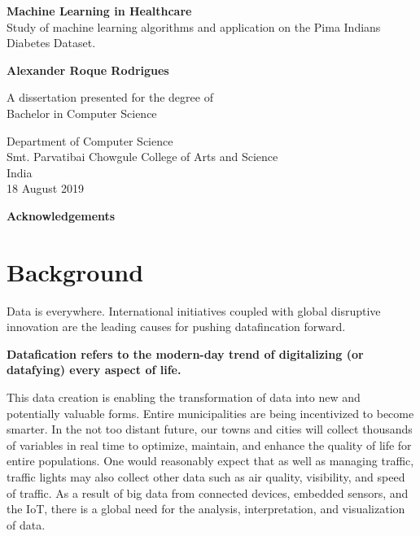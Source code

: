 \documentclass[12pt]{article}
\begin{document}
\begin{titlepage}
    \begin{center}
        \vspace*{1cm} 
        \Huge
        \textbf{Machine Learning in Healthcare} 
        \vspace{0.5cm}
        \normalsize
        \vspace{0cm}
        \\
        Study of machine learning algorithms and application on the Pima Indians Diabetes Dataset.
 
        \vspace{1.5cm}
 
        \textbf{Alexander Roque Rodrigues}
 
        \vfill
 
        A dissertation presented for the degree of\\
        Bachelor in Computer Science
 
        \vspace{0.8cm}
  
        \Large
        Department of Computer Science\\        
        Smt. Parvatibai Chowgule College of Arts and Science\\
        India\\
        18 August 2019
 
    \end{center}
\end{titlepage}
\Huge
\newpage
\huge
\textbf{Acknowledgements}
\normalsize
\newpage
\tableofcontents
\newpage
\part{Background}
Data is everywhere. International initiatives coupled with global disruptive innovation are the leading causes for pushing datafincation forward.

\textbf{Datafication refers to the modern-day trend of digitalizing (or datafying) every aspect of life.}

This data creation is enabling the transformation of data into new and potentially valuable forms. Entire municipalities are being incentivized to become smarter. In the not too
distant future, our towns and cities will collect thousands of variables in
real time to optimize, maintain, and enhance the quality of life for entire
populations. One would reasonably expect that as well as managing traffic,
traffic lights may also collect other data such as air quality, visibility, and
speed of traffic. As a result of big data from connected devices, embedded
sensors, and the IoT, there is a global need for the analysis, interpretation,
and visualization of data.
\end{document}
